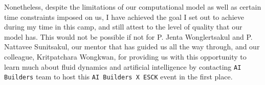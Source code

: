 Nonetheless, despite the limitations of our computational model as well as certain time constraints imposed on us, I have achieved the goal I set out to achieve during my time in this camp, and still attest to the level of quality that our model has. This would not be possible if not for P. Jenta Wonglertsakul and P. Nattavee Sunitsakul, our mentor that has guided us all the way through, and our colleague, Kritpatchara Wongkwan, for providing us with this opportunity to learn much about fluid dynamics and artificial intelligence by contacting \texttt{AI Builders} team to host this \texttt{AI Builders X ESCK} event in the first place.
